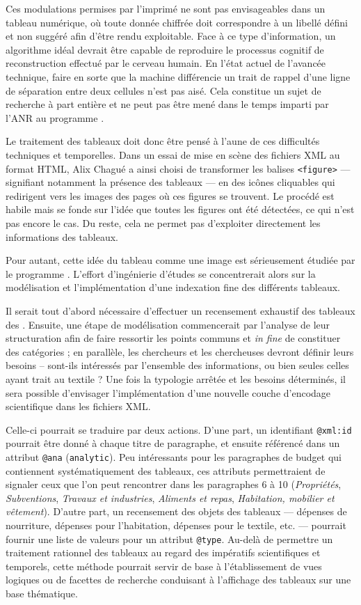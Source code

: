 Ces modulations permises par l'imprimé ne sont pas envisageables dans un tableau numérique, où toute donnée chiffrée doit correspondre à un libellé défini et non suggéré afin d'être rendu exploitable. Face à ce type d'information, un algorithme idéal devrait être capable de reproduire le processus cognitif de reconstruction effectué par le cerveau humain. En l'état actuel de l'avancée technique, faire en sorte que la machine différencie un trait de rappel d'une ligne de séparation entre deux cellules n'est pas aisé. Cela constitue un sujet de recherche à part entière et ne peut pas être mené dans le temps imparti par l'ANR au programme \timeus.

Le traitement des tableaux doit donc être pensé à l'aune de ces difficultés techniques et temporelles. Dans un essai de mise en scène des fichiers XML au format HTML, Alix Chagué a ainsi choisi de transformer les balises \texttt{<figure>} --- signifiant notamment la présence des tableaux --- en des icônes cliquables qui redirigent vers les images des pages où ces figures se trouvent. Le procédé est habile mais se fonde sur l'idée que toutes les figures ont été détectées, ce qui n'est pas encore le cas. Du reste, cela ne permet pas d'exploiter directement les informations des tableaux.

Pour autant, cette idée du tableau comme une image est sérieusement étudiée par le programme \timeus. L'effort d'ingénierie d'études se concentrerait alors sur la modélisation et l'implémentation d'une indexation fine des différents tableaux.

Il serait tout d'abord nécessaire d'effectuer un recensement exhaustif des tableaux des \odm. Ensuite, une étape de modélisation commencerait par l'analyse de leur structuration afin de faire ressortir les points communs et \textit{in fine} de constituer des catégories ; en parallèle, les chercheurs et les chercheuses devront définir leurs besoins -- sont-ils intéressés par l'ensemble des informations, ou bien seules celles ayant trait au textile ? Une fois la typologie arrêtée et les besoins déterminés, il sera possible d'envisager l'implémentation d'une nouvelle couche d'encodage scientifique dans les fichiers XML.

Celle-ci pourrait se traduire par deux actions. D'une part, un identifiant \texttt{@xml:id} pourrait être donné à chaque titre de paragraphe, et ensuite référencé dans un attribut \texttt{@ana} (\texttt{analytic}). Peu intéressants pour les paragraphes de budget qui contiennent systématiquement des tableaux, ces attributs permettraient de signaler ceux que l'on peut rencontrer dans les paragraphes 6 à 10 (\textit{Propriétés}, \textit{Subventions}, \textit{Travaux et industries}, \textit{Aliments et repas}, \textit{Habitation, mobilier et vêtement}). D'autre part, un recensement des objets des tableaux --- dépenses de nourriture, dépenses pour l'habitation, dépenses pour le textile, etc. --- pourrait fournir une liste de valeurs pour un attribut \texttt{@type}. Au-delà de permettre un traitement rationnel des tableaux au regard des impératifs scientifiques et temporels, cette méthode pourrait servir de base à l'établissement de vues logiques ou de facettes de recherche conduisant à l'affichage des tableaux sur une base thématique.

